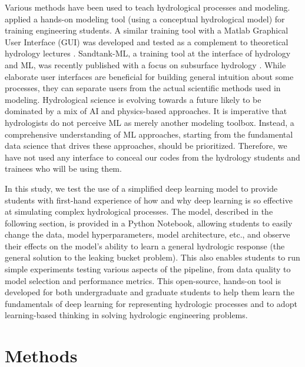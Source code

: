 \documentclass{article}
\begin{document}
Various methods have been used to teach hydrological processes and modeling. \cite{aghakouchak2010application} applied a hands-on modeling tool (using a conceptual hydrological model) for training engineering students. A similar training tool with a Matlab Graphical User Interface (GUI) was developed and tested as a complement to theoretical hydrology lectures \citep{aghakouchak2013educational}. Sandtank-ML, a training tool at the interface of hydrology and ML, was recently published with a focus on subsurface hydrology \citep{gallagher2021sandtank}. While elaborate user interfaces are beneficial for building general intuition about some processes, they can separate users from the actual scientific methods used in modeling. Hydrological science is evolving towards a future likely to be dominated by a mix of AI and physics-based approaches. It is imperative that hydrologists do not perceive ML as merely another modeling toolbox. Instead, a comprehensive understanding of ML approaches, starting from the fundamental data science that drives these approaches, should be prioritized. Therefore, we have not used any interface to conceal our codes from the hydrology students and trainees who will be using them.

In this study, we test the use of a simplified deep learning model to provide students with first-hand experience of how and why deep learning is so effective at simulating complex hydrological processes. The model, described in the following section, is provided in a Python Notebook, allowing students to easily change the data, model hyperparameters, model architecture, etc., and observe their effects on the model's ability to learn a general hydrologic response (the general solution to the leaking bucket problem). This also enables students to run simple experiments testing various aspects of the pipeline, from data quality to model selection and performance metrics. This open-source, hands-on tool is developed for both undergraduate and graduate students to help them learn the fundamentals of deep learning for representing hydrologic processes and to adopt learning-based thinking in solving hydrologic engineering problems.

\section{Methods}
\label{sec:Methods}
\end{document}
